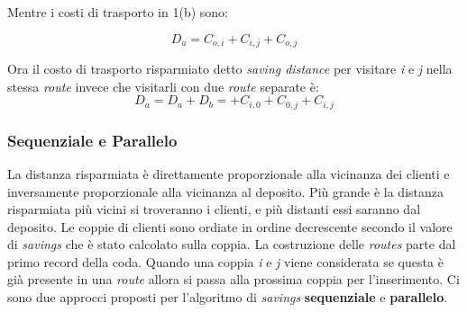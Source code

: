 \documentclass[]{article}
\begin{document}
Mentre i costi di trasporto in 1(b) sono:

\begin{equation}
D_{a} = C_{o,i} +C_{i,j} + C_{o,j} 
\end{equation}

Ora il costo di trasporto risparmiato detto \emph{saving distance} per visitare \emph{i} e \emph{j} nella stessa \emph{route} invece che visitarli con due \emph{route} separate è:
\begin{equation}
D_{a} = D_{a} +D_{b} =+ C_{i,0} +  C_{0,j} +  C_{i,j} 
\end{equation}

\subsubsection{Sequenziale e Parallelo }
La distanza risparmiata è direttamente proporzionale alla vicinanza dei clienti e inversamente proporzionale alla vicinanza al deposito.
Più grande è la distanza risparmiata più vicini si troveranno i clienti, e più distanti essi saranno dal deposito.
Le coppie di clienti sono ordiate in ordine decrescente secondo il valore di \emph{savings} che è stato calcolato sulla coppia.
La costruzione delle \emph{routes} parte dal primo record della coda. Quando una coppia \emph{i}  e \emph{j} viene considerata se questa è già presente in una \emph{route} allora si passa alla prossima coppia per l'inserimento.
Ci sono due approcci proposti per l'algoritmo di \emph{savings} \textbf{sequenziale}  e \textbf{parallelo}.
\end{document}
